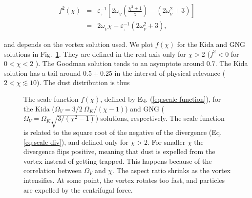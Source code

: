 \documentclass[apj]{emulateapj}
\newcommand{\Eq}[1]{Eq. (\ref{#1})}
\newcommand{\eq}[1]{\Eq{#1}}
\newcommand{\eqp}[1]{(Eq. \ref{#1})}
\newcommand{\Fig}[1]{Fig.~\ref{#1}}
\newcommand{\fig}[1]{\Fig{#1}}
\newcommand{\beqn}{\begin{eqnarray}}
\newcommand{\eeqn}{\end{eqnarray}}
\newcommand{\epsp}{\varepsilon_{_{+}}}
\begin{document}
\beqn
f^2(\chi) &=& \epsp^{-1} \left[2\omega_{_V}\left(\frac{\chi^2+1}{\chi}\right) - (2\omega_{_V}^2 + 3) \right]\nonumber \\
          &=& 2\omega_{_V}\chi - \epsp^{-1}(2\omega_{_V}^2 + 3),
\label{eq:scale-function}
\eeqn

\noindent and depends on the vortex solution
used. We plot $f(\chi)$ for the Kida and GNG solutions in
\fig{fig:scale-function}. They are defined in the real axis only for $\chi > 2$ ($f^2
< 0$ for $0 < \chi < 2$ ). The Goodman solution tends to an asymptote
around 0.7. The Kida solution has a  tail around $0.5\pm0.25$ in the
interval of physical relevance ($2 < \chi \lesssim 10$). The dust distribution is thus 

\begin{figure}
  \begin{center}
  \end{center}
\caption[]{The scale function $f(\chi)$, defined by
  \eq{eq:scale-function}, for the Kida ($\varOmega_V=3/2
  \ \varOmega_K/(\chi-1)$) and GNG ($\varOmega_V=\varOmega_K
  \sqrt{3/(\chi^2-1)}$) solutions, respectively. The scale function is
  related to the square root of the negative of the divergence
  \eqp{eq:scale-div}, and defined only for $\chi>2$. For smaller $\chi$ the
  divergence flips positive, meaning that dust is expelled from the
  vortex instead of getting trapped. This happens because of the
  correlation between $\varOmega_V$ and $\chi$. The aspect ratio shrinks
  as the vortex intensifies. At some point, the vortex rotates too
  fast, and particles are expelled by the centrifugal force.}
 \label{fig:scale-function}
\end{figure}
\end{document}
